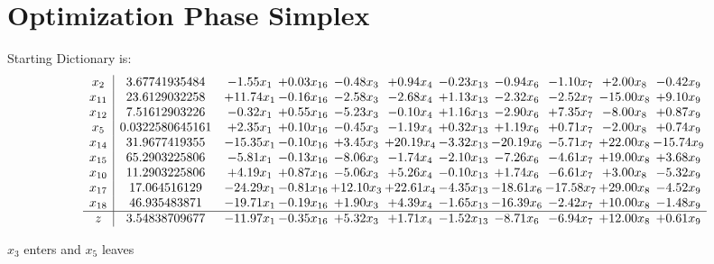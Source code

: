 \documentclass[9pt]{article}
\begin{document}
\section{Optimization Phase Simplex}
Starting Dictionary is:
\[\begin{array}{c| c c@{\hskip 2pt} c@{\hskip 2pt} c@{\hskip 2pt} c@{\hskip 2pt} c@{\hskip 2pt} c@{\hskip 2pt} c@{\hskip 2pt} c@{\hskip 2pt} c@{\hskip 2pt} }
 x_{2}   &  3.67741935484 & -1.55 x_{1} & +  0.03 x_{16} & -0.48 x_{3} & +  0.94 x_{4} & -0.23 x_{13} & -0.94 x_{6} & -1.10 x_{7} & +  2.00 x_{8} & -0.42 x_{9}\\
 x_{11}   &  23.6129032258 & + 11.74 x_{1} & -0.16 x_{16} & -2.58 x_{3} & -2.68 x_{4} & +  1.13 x_{13} & -2.32 x_{6} & -2.52 x_{7} & -15.00 x_{8} & +  9.10 x_{9}\\
 x_{12}   &  7.51612903226 & -0.32 x_{1} & +  0.55 x_{16} & -5.23 x_{3} & -0.10 x_{4} & +  1.16 x_{13} & -2.90 x_{6} & +  7.35 x_{7} & -8.00 x_{8} & +  0.87 x_{9}\\
 x_{5}   &  0.0322580645161 & +  2.35 x_{1} & +  0.10 x_{16} & -0.45 x_{3} & -1.19 x_{4} & +  0.32 x_{13} & +  1.19 x_{6} & +  0.71 x_{7} & -2.00 x_{8} & +  0.74 x_{9}\\
 x_{14}   &  31.9677419355 & -15.35 x_{1} & -0.10 x_{16} & +  3.45 x_{3} & + 20.19 x_{4} & -3.32 x_{13} & -20.19 x_{6} & -5.71 x_{7} & + 22.00 x_{8} & -15.74 x_{9}\\
 x_{15}   &  65.2903225806 & -5.81 x_{1} & -0.13 x_{16} & -8.06 x_{3} & -1.74 x_{4} & -2.10 x_{13} & -7.26 x_{6} & -4.61 x_{7} & + 19.00 x_{8} & +  3.68 x_{9}\\
 x_{10}   &  11.2903225806 & +  4.19 x_{1} & +  0.87 x_{16} & -5.06 x_{3} & +  5.26 x_{4} & -0.10 x_{13} & +  1.74 x_{6} & -6.61 x_{7} & +  3.00 x_{8} & -5.32 x_{9}\\
 x_{17}   &  17.064516129 & -24.29 x_{1} & -0.81 x_{16} & + 12.10 x_{3} & + 22.61 x_{4} & -4.35 x_{13} & -18.61 x_{6} & -17.58 x_{7} & + 29.00 x_{8} & -4.52 x_{9}\\
 x_{18}   &  46.935483871 & -19.71 x_{1} & -0.19 x_{16} & +  1.90 x_{3} & +  4.39 x_{4} & -1.65 x_{13} & -16.39 x_{6} & -2.42 x_{7} & + 10.00 x_{8} & -1.48 x_{9}\\
\hline
z    &  3.54838709677 & -11.97 x_{1} & -0.35 x_{16} & +  5.32 x_{3} & +  1.71 x_{4} & -1.52 x_{13} & -8.71 x_{6} & -6.94 x_{7} & + 12.00 x_{8} & +  0.61 x_{9}\\
\end{array}\]


 $ x_{3} $ enters and $ x_{5} $ leaves 
\end{document}
